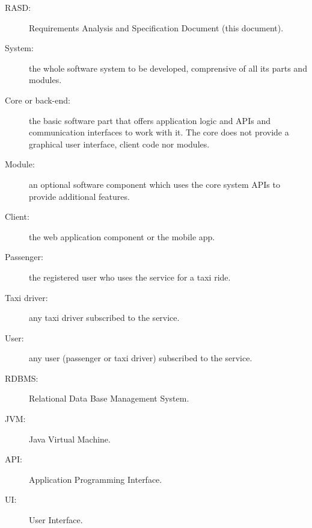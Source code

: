 \begin{description}
\item[RASD:] Requirements Analysis and Specification Document (this document).
\item[System:] the whole software system to be developed, comprensive of all its parts and modules.
\item[Core or back-end:] the basic software part that offers application logic and APIs and communication interfaces to work with it. The core does not provide a graphical user interface, client code nor modules.
\item[Module:] an optional software component which uses the core system APIs to provide additional features.
\item[Client:] the web application component or the mobile app.
\item[Passenger:] the registered user who uses the service for a taxi ride.
\item[Taxi driver:] any taxi driver subscribed to the service.
\item[User:] any user (passenger or taxi driver) subscribed to the service.
\item[RDBMS:] Relational Data Base Management System.
\item[JVM:] Java Virtual Machine.
\item[API:] Application Programming Interface.
\item[UI:] User Interface.
\end{description}
